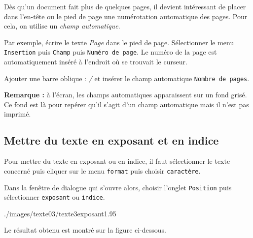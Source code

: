 Dès qu'un document fait plus de quelques pages, il devient intéressant de placer dans l'en-tête ou le pied de page une numérotation automatique des pages. Pour cela, on utilise un \emph{champ automatique}. 

Par exemple, écrire le texte \emph{Page } dans le pied de page. Sélectionner le menu \texttt{Insertion} puis \texttt{Champ} puis \texttt{Numéro de page}. Le numéro de la page est automatiquement inséré à l'endroit où se trouvait le curseur.


Ajouter une barre oblique : \emph{/} et insérer le champ automatique \texttt{Nombre de pages}.


\textbf{Remarque :} à l'écran, les champs automatiques apparaissent sur un fond grisé. Ce fond est là pour repérer qu'il s'agit d'un champ automatique mais il n'est pas imprimé.



\subsection{Mettre du texte en exposant et en indice}\label{Texte3exposantIndice}

Pour mettre du texte en exposant ou en indice, il faut sélectionner le texte concerné puis cliquer sur le menu \texttt{format} puis choisir \texttt{caractère}.


Dans la fenêtre de dialogue qui s'ouvre alors, choisir l'onglet \texttt{Position} puis sélectionner \texttt{exposant} ou \texttt{indice}.

%
	    {./images/texte03/texte3exposant1}{.95\textwidth}

Le résultat obtenu est montré sur la figure ci-dessous.


